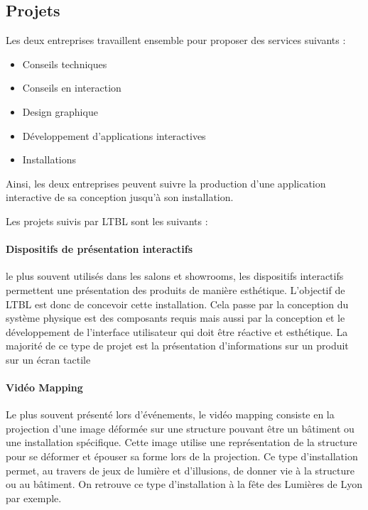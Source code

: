 \subsection{Projets}

Les deux entreprises travaillent ensemble pour proposer des services suivants :

\begin{itemize}
    \item Conseils techniques
    \item Conseils en interaction
    \item Design graphique
    \item Développement d'applications interactives
    \item Installations
\end{itemize}

Ainsi, les deux entreprises peuvent suivre la production d'une application interactive de sa conception jusqu'à son installation.

\clearpage

Les projets suivis par LTBL sont les suivants :

\paragraph{Dispositifs de présentation interactifs} le plus souvent utilisés dans les salons et showrooms, les dispositifs interactifs permettent une présentation des produits de manière esthétique.
L'objectif de LTBL est donc de concevoir cette installation.
Cela passe par la conception du système physique est des composants requis mais aussi par la conception et le développement de l'interface utilisateur qui doit être réactive et esthétique.
La majorité de ce type de projet est la présentation d'informations sur un produit sur un écran tactile

\paragraph{Vidéo Mapping} Le plus souvent présenté lors d'événements, le vidéo mapping consiste en la projection d'une image déformée sur une structure pouvant être un bâtiment ou une installation spécifique.
Cette image utilise une représentation de la structure pour se déformer et épouser sa forme lors de la projection.
Ce type d'installation permet, au travers de jeux de lumière et d'illusions, de donner vie à la structure ou au bâtiment.
On retrouve ce type d'installation à la fête des Lumières de Lyon par exemple.

